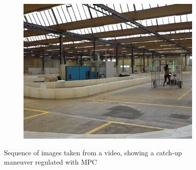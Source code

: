 \documentclass[a4paper,12pt,oneside]{book}
\begin{document}
\begin{figure}[h!]
\begin{subfigure}[b]{0.32\textwidth}
        \includegraphics[width=\textwidth]{Catch/Catch9.png}
    \end{subfigure}
    \caption{Sequence of images taken from a video, showing a catch-up maneuver regulated with MPC }
\label{MPC_hard_img1}
\end{figure}
\end{document}
